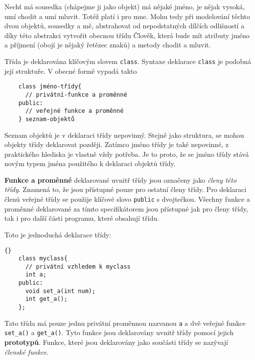     \begin{example}
      Nechť má sousedka (chápejme ji jako objekt) má nějaké jméno, je nějak vysoká, umí chodit a umí mluvit. Totéž platí i pro
      mne. Mohu tedy při modelování těchto dvou objektů, sousedky a mě, abstrahovat od nepodstatných dílčích odlišností a díky
      této abstrakci vytvořit obecnou třídu Člověk, která bude mít atributy jméno a příjmení (obojí je nějaký řetězec znaků) a
      metody chodit a mluvit.
    \end{example}

    Třída je deklarována klíčovým slovem \lstinline[basicstyle=\ttfamily]!class!. Syntaxe deklarace
    \lstinline[basicstyle=\ttfamily]!class! je podobná její struktuře. V obecné formě vypadá takto

    \lstset{numbers=none}
    \begin{lstlisting}
    class jméno-třídy{
      // privátní-funkce a proměnné
    public:
      // veřejné funkce a proměnné
    } seznam-objektů
    \end{lstlisting}
    Seznam objektů je v deklaraci třídy nepovinný. Stejně jako struktura, se  mohou  objekty třídy deklarovat později. Zatímco
    jméno třídy je také nepovinné, z praktického hlediska je vlastně vždy potřeba. Je to proto, že se jméno třídy stává novým
    typem jména použitého k deklaraci objektů třídy.

    \textbf{Funkce a proměnné} deklarované uvnitř třídy jsou označeny jako \textit{členy této třídy}. Znamená to, že jsou
    přístupné pouze pro ostatní členy třídy. Pro deklaraci členů veřejné třídy se použije klíčové slovo
    \lstinline[basicstyle=\ttfamily]!public! s dvojtečkou. Všechny funkce a proměn\-né deklarované za tímto specifikátorem jsou
    přístupné jak pro členy třídy, tak i pro další části programu, které obsahují třídu.

    Toto je jednoduchá deklarace třídy:

    \begin{lstlisting}{}
    class myclass{
      // privátní vzhledem k myclass
      int a;
    public:
      void set_a(int num);
      int get_a();
    };
    \end{lstlisting}
    Tato třída má pouze jednu privátní proměnnou nazvanou \lstinline[basicstyle=\ttfamily]!a! a dvě veřejné funkce
    \lstinline[basicstyle=\ttfamily]!set_a()! a \lstinline[basicstyle=\ttfamily]!get_a()!. Tyto funkce jsou deklarovány uvnitř
    třídy pomocí jejich \textbf{prototypů}. Funkce, které jsou deklarovány jako součásti třídy se nazývají \textit{členské
    funkce}.

